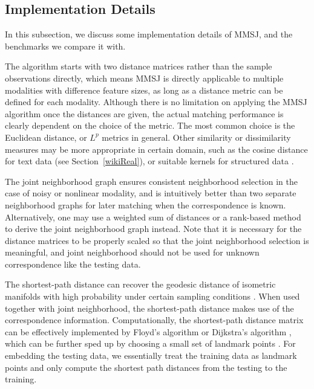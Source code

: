 \documentclass[times,twocolumn,final]{elsarticle}
\begin{document}
\subsection{Implementation Details}
\label{discuss}
In this subsection, we discuss some implementation details of MMSJ, and the benchmarks we compare it with.

The algorithm starts with two distance matrices rather than the sample observations directly, which means MMSJ is directly applicable to multiple modalities with difference feature sizes, as long as a distance metric can be defined for each modality. Although there is no limitation on applying the MMSJ algorithm once the distances are given, the actual matching performance is clearly dependent on the choice of the metric. The most common choice is the Euclidean distance, or $L^{p}$ metrics in general. Other similarity or dissimilarity measures may be more appropriate in certain domain, such as the cosine distance for text data (see Section~\ref{wikiReal}), or suitable kernels for structured data \citep{HofmannEtAl2008}. 

The joint neighborhood graph ensures consistent neighborhood selection in the case of noisy or nonlinear modality, and is intuitively better than two separate neighborhood graphs for later matching when the correspondence is known. Alternatively, one may use a weighted sum of distances or a rank-based method to derive the joint neighborhood graph instead. Note that it is necessary for the distance matrices to be properly scaled so that the joint neighborhood selection is meaningful, and joint neighborhood should not be used for unknown correspondence like the testing data. 

The shortest-path distance can recover the geodesic distance of isometric manifolds with high probability under certain sampling conditions \citep{BernsteinEtAl2000, SilvaTenenbaum2003}. When used together with joint neighborhood, the shortest-path distance makes use of the correspondence information. Computationally, the shortest-path distance matrix can be effectively implemented by Floyd's algorithm or Dijkstra's algorithm \citep{TenenbaumSilvaLangford2000}, which can be further sped up by choosing a small set of landmark points \citep{SilvaTenenbaum2003, BengioEtal2003}. For embedding the testing data, we essentially treat the training data as landmark points and only compute the shortest path distances from the testing to the training.
\end{document}

